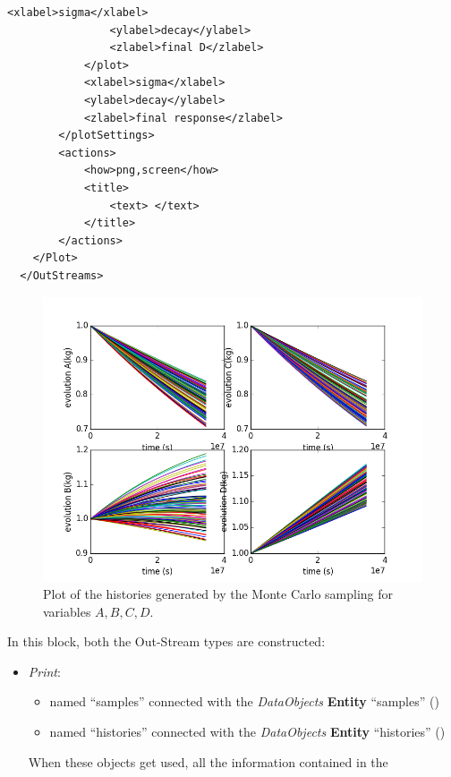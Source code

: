 \begin{enumerate}
\begin{lstlisting}[style=XML,morekeywords={arg,extension,pauseAtEnd,overwrite}]
                <xlabel>sigma</xlabel>
                <ylabel>decay</ylabel>
                <zlabel>final D</zlabel>
            </plot>
            <xlabel>sigma</xlabel>
            <ylabel>decay</ylabel>
            <zlabel>final response</zlabel>
        </plotSettings>
        <actions>
            <how>png,screen</how>
            <title>
                <text> </text>
            </title>
        </actions>
    </Plot>
  </OutStreams>
\end{lstlisting}
 \begin{figure}[h!]
  \centering
  \includegraphics[scale=0.7]{pics/MC_histories.png}
  \caption{Plot of the histories generated by the Monte Carlo sampling for variables $A,B,C,D$.}
  \label{fig:historiesMCPlotLine}
 \end{figure}
  In this block, both the Out-Stream types are constructed: 
  \begin{itemize}
    \item \textit{Print}: 
     \begin{itemize}
       \item named ``samples'' connected with the \textit{DataObjects} \textbf{Entity} ``samples'' 
                ()
       \item named ``histories'' connected with the \textit{DataObjects} \textbf{Entity} ``histories'' ()          
     \end{itemize}         
      When these objects get used, all the information contained in the 

\end{itemize}
\end{enumerate}
